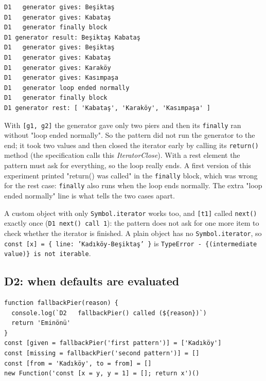 \documentclass[
  10pt,
]{article}
\begin{document}
\begin{verbatim}
D1   generator gives: Beşiktaş
D1   generator gives: Kabataş
D1   generator finally block
D1 generator result: Beşiktaş Kabataş
D1   generator gives: Beşiktaş
D1   generator gives: Kabataş
D1   generator gives: Karaköy
D1   generator gives: Kasımpaşa
D1   generator loop ended normally
D1   generator finally block
D1 generator rest: [ 'Kabataş', 'Karaköy', 'Kasımpaşa' ]
\end{verbatim}

With \texttt{[\allowbreak{}g1,\allowbreak{} g2]} the generator gave only
two piers and then its \texttt{finally} ran without "loop ended
normally". So the pattern did not run the generator to the end; it took
two values and then closed the iterator early by calling its
\texttt{return(\allowbreak{})} method (the specification calls this
\emph{IteratorClose}). With a rest element the pattern must ask for
everything, so the loop really ends. A first version of this experiment
printed "return() was called" in the \texttt{finally} block, which was
wrong for the rest case: \texttt{finally} also runs when the loop ends
normally. The extra "loop ended normally" line is what tells the two
cases apart.

A custom object with only \texttt{Symbol.\allowbreak{}iterator} works
too, and \texttt{[\allowbreak{}t1]} called \texttt{next(\allowbreak{})}
exactly once (\texttt{D1   next(\allowbreak{}) call 1}): the pattern
does not ask for one more item to check whether the iterator is
finished. A plain object has no \texttt{Symbol.\allowbreak{}iterator},
so
\texttt{const [\allowbreak{}x] =\allowbreak{} \{ line:\allowbreak{} 'Kadıköy-Beşiktaş' \}}
is
\texttt{TypeError - \{(\allowbreak{}intermediate value)\} is not iterable}.

\hypertarget{d2-when-defaults-are-evaluated}{%
\subsection{D2: when defaults are
evaluated}\label{d2-when-defaults-are-evaluated}}

\begin{verbatim}
function fallbackPier(reason) {
  console.log(`D2   fallbackPier() called (${reason})`)
  return 'Eminönü'
}
const [given = fallbackPier('first pattern')] = ['Kadıköy']
const [missing = fallbackPier('second pattern')] = []
const [from = 'Kadıköy', to = from] = []
new Function('const [x = y, y = 1] = []; return x')()
\end{verbatim}
\end{document}
